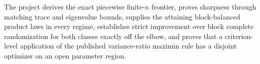 The project derives the exact piecewise finite-\(n\) frontier, proves sharpness through matching trace and eigenvalue bounds, supplies the attaining block-balanced product laws in every regime, establishes strict improvement over block complete randomization for both classes exactly off the elbow, and proves that a criterion-level application of the published variance-ratio maximin rule has a disjoint optimizer on an open parameter region.
